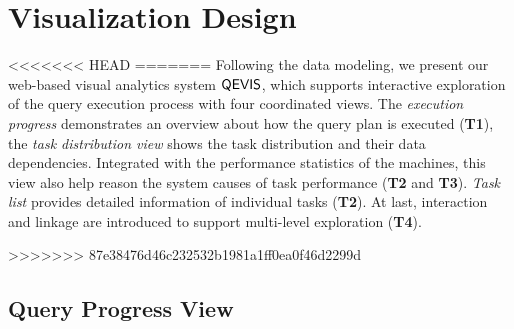 
\section{Visualization Design}

<<<<<<< HEAD
=======
Following the data modeling, we present our web-based visual analytics system $\mathsf{QEVIS}$, which supports interactive exploration of the query execution process with four coordinated views. The \textit{execution progress} demonstrates an overview about how the query plan is executed (\textbf{T1}), the \textit{task distribution view} shows the task distribution and their data dependencies. Integrated with the performance statistics of the machines, this view also help reason the system causes of task performance (\textbf{T2} and \textbf{T3}). \textit{Task list} provides detailed information of individual tasks (\textbf{T2}).  At last, interaction and linkage are introduced to support multi-level exploration (\textbf{T4}).

>>>>>>> 87e38476d46c232532b1981a1ff0ea0f46d2299d
\subsection{Query Progress View}\label{sec:queryprogress}


